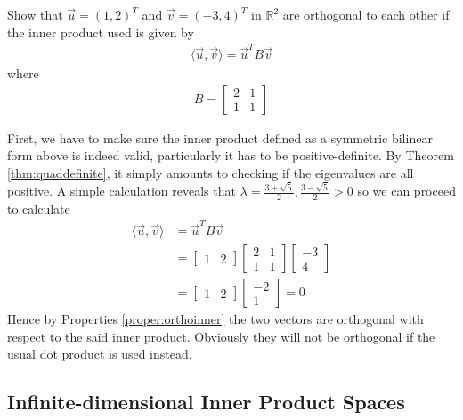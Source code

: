 \begin{exmp}
Show that $\vec{u} = (1,2)^T$ and $\vec{v} = (-3,4)^T$ in $\mathbb{R}^2$ are orthogonal to each other if the inner product used is given by
\begin{align*}
\langle\vec{u}, \vec{v}\rangle = \vec{u}^TB\vec{v}
\end{align*}
where 
\begin{align*}
B = 
\begin{bmatrix}
2 & 1 \\
1 & 1
\end{bmatrix}
\end{align*}
\end{exmp}
\begin{solution}
First, we have to make sure the inner product defined as a symmetric bilinear form above is indeed valid, particularly it has to be positive-definite. By Theorem \ref{thm:quaddefinite}, it simply amounts to checking if the eigenvalues are all positive. A simple calculation reveals that $\lambda = \frac{3+\sqrt{5}}{2}, \frac{3-\sqrt{5}}{2} > 0$ so we can proceed to calculate
\begin{align*}
\langle\vec{u}, \vec{v}\rangle &= \vec{u}^TB\vec{v} \\
&= \begin{bmatrix}
1 & 2
\end{bmatrix}
\begin{bmatrix}
2 & 1 \\
1 & 1
\end{bmatrix}
\begin{bmatrix}
-3 \\
4
\end{bmatrix} \\
&= \begin{bmatrix}
1 & 2
\end{bmatrix}
\begin{bmatrix}
-2 \\
1
\end{bmatrix} = 0
\end{align*}
Hence by Properties \ref{proper:orthoinner} the two vectors are orthogonal with respect to the said inner product. Obviously they will not be orthogonal if the usual dot product is used instead.
\end{solution}

\subsection{Infinite-dimensional Inner Product Spaces}
\label{section:infinner}

